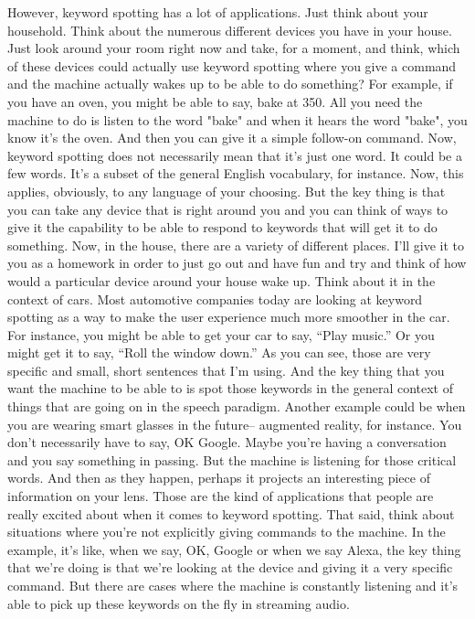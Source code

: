 However, keyword spotting has a lot of applications.
Just think about your household.
Think about the numerous different devices you have in your house.
Just look around your room right now and take, for a moment,
and think, which of these devices could actually
use keyword spotting where you give a command and the machine
actually wakes up to be able to do something?
For example, if you have an oven, you might be able to say, bake at 350.
All you need the machine to do is listen to the word "bake"
and when it hears the word "bake", you know it's the oven.
And then you can give it a simple follow-on command.
Now, keyword spotting does not necessarily
mean that it's just one word.
It could be a few words.
It's a subset of the general English vocabulary, for instance.
Now, this applies, obviously, to any language of your choosing.
But the key thing is that you can take any device that is right around you
and you can think of ways to give it the capability
to be able to respond to keywords that will get it to do something.
Now, in the house, there are a variety of different places.
I'll give it to you as a homework in order
to just go out and have fun and try and think
of how would a particular device around your house wake up.
Think about it in the context of cars.
Most automotive companies today are looking at keyword spotting as a way
to make the user experience much more smoother in the car.
For instance, you might be able to get your car to say, ``Play music.''
Or you might get it to say, ``Roll the window down.''
As you can see, those are very specific and small,
short sentences that I'm using.
And the key thing that you want the machine to be able to
is spot those keywords in the general context of things that
are going on in the speech paradigm.
Another example could be when you are wearing smart glasses in the future--
augmented reality, for instance.
You don't necessarily have to say, OK Google.
Maybe you're having a conversation and you say something in passing.
But the machine is listening for those critical words.
And then as they happen, perhaps it projects an interesting piece
of information on your lens.
Those are the kind of applications that people are really excited about when
it comes to keyword spotting.
That said, think about situations where you're not explicitly
giving commands to the machine.
In the example, it's like, when we say, OK, Google
or when we say Alexa, the key thing that we're doing
is that we're looking at the device and giving it a very specific command.
But there are cases where the machine is constantly listening
and it's able to pick up these keywords on the fly in streaming audio.
